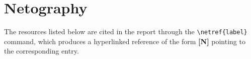 \chapter*{Netography}
{}


\newcommand{\netsrc}[1]{%
  \refstepcounter{netrefctr}\label{#1}%
  \textbf{[\thenetrefctr]}%
}

\begingroup
\sloppy
\small
\setlength{\LTpre}{4pt}
\setlength{\LTpost}{4pt}

\noindent
The resources listed below are cited in the report through the
\texttt{\textbackslash netref\{label\}} command, which produces a hyperlinked
reference of the form \textbf{[N]} pointing to the corresponding entry.

\medskip

